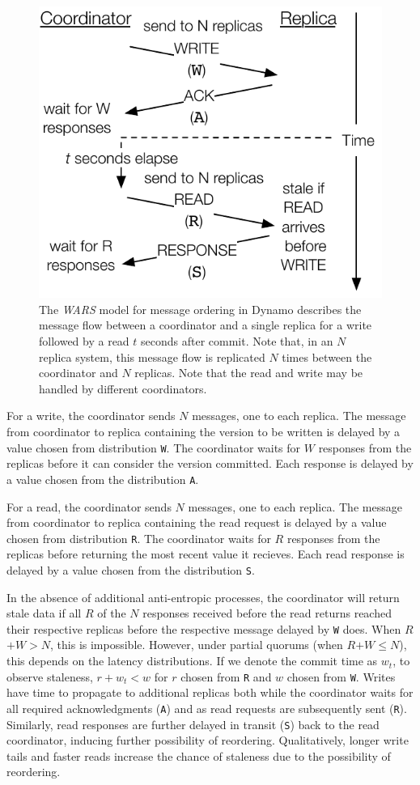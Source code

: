 \documentclass{vldb}
\begin{document}
\begin{figure}
\centering
\includegraphics[width=.8\columnwidth]{figs/dynamostale.pdf}
\caption{The \textit{WARS}  model for message ordering in Dynamo describes the
  message flow between a coordinator and a single replica for a write
  followed by a read $t$ seconds after commit.  Note that, in an $N$
  replica system, this message flow is replicated $N$ times between
  the coordinator and $N$ replicas.  Note that the read and write may be handled by different coordinators.}
\label{fig:dynamo-diagram}
\end{figure}

For a write, the coordinator sends $N$ messages, one to each
replica. The message from coordinator to replica containing the
version to be written is delayed by a value chosen from distribution
\texttt{W}.  The coordinator waits for $W$ responses from the replicas
before it can consider the version committed.  Each response is delayed by
a value chosen from the distribution \texttt{A}.

For a read, the coordinator sends $N$ messages, one to each replica.
The message from coordinator to replica containing the read request is
delayed by a value chosen from distribution \texttt{R}.  The
coordinator waits for $R$ responses from the replicas before returning
the most recent value it recieves.  Each read response is delayed by a
value chosen from the distribution \texttt{S}.

In the absence of additional anti-entropic processes, the coordinator
will return stale data if all $R$ of the $N$ responses received before
the read returns reached their respective replicas before the
respective message delayed by \texttt{W} does.  When $R$$+$$W$$>$$N$,
this is impossible.  However, under partial quorums (when
$R$$+$$W$$\leq$$N$), this depends on the latency distributions.  If we
denote the commit time as $w_t$, to observe staleness, $r+w_t < w$ for
$r$ chosen from \texttt{R} and $w$ chosen from \texttt{W}.  Writes
have time to propagate to additional replicas both while the
coordinator waits for all required acknowledgments (\texttt{A}) and as
read requests are subsequently sent (\texttt{R}).  Similarly, read
responses are further delayed in transit (\texttt{S}) back to the read
coordinator, inducing further possibility of reordering.
Qualitatively, longer write tails and faster reads increase the chance
of staleness due to the possibility of reordering.
\end{document}
